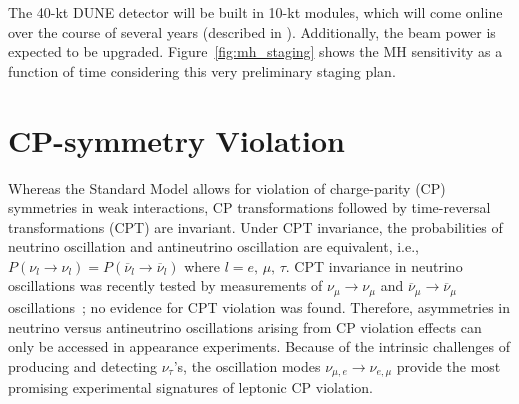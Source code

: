 The 40-kt DUNE detector will be built in 10-kt modules, which will come online over the course of several years (described in \voldune).  Additionally, the beam power is expected to be upgraded. Figure~\ref{fig:mh_staging} shows the MH sensitivity as a function of time considering this very preliminary staging plan. 



\section{CP-symmetry Violation}
\label{sec:physics-lbnosc-cpv}

Whereas the Standard Model allows for violation of charge-parity (CP) symmetries in weak interactions, 
CP transformations followed by time-reversal transformations (CPT) are invariant. 
Under CPT invariance, the probabilities of neutrino oscillation and antineutrino oscillation
are equivalent, i.e., $P(\nu_l \rightarrow \nu_l) =
P(\overline{\nu}_l\rightarrow \overline{\nu}_l)$
where $l = e,\, \mu,\, \tau$. CPT invariance in neutrino oscillations was recently
 tested by measurements of $\nu_\mu
\rightarrow \nu_\mu$ and $\overline{\nu}_\mu \rightarrow \overline{\nu}_\mu$
oscillations~\cite{Adamson:2013whj}; no evidence for CPT
violation was found.  Therefore, asymmetries in neutrino versus antineutrino
oscillations arising from CP violation effects can only be accessed in
appearance experiments.  Because of the intrinsic challenges of
producing and detecting $\nu_\tau$'s, the oscillation modes
$\nu_{\mu,e} \rightarrow \nu_{e,\mu}$ provide the most promising
experimental signatures of leptonic CP violation.

